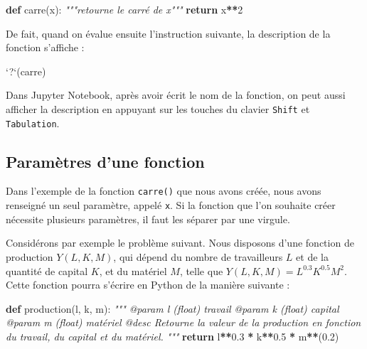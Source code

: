 \documentclass[12pt,]{book}
\newenvironment{Shaded}{\begin{snugshade}}{\end{snugshade}}
\newcommand{\KeywordTok}[1]{\textcolor[rgb]{0.13,0.29,0.53}{\textbf{#1}}}
\newcommand{\DataTypeTok}[1]{\textcolor[rgb]{0.13,0.29,0.53}{#1}}
\newcommand{\DecValTok}[1]{\textcolor[rgb]{0.00,0.00,0.81}{#1}}
\newcommand{\FloatTok}[1]{\textcolor[rgb]{0.00,0.00,0.81}{#1}}
\newcommand{\StringTok}[1]{\textcolor[rgb]{0.31,0.60,0.02}{#1}}
\newcommand{\CommentTok}[1]{\textcolor[rgb]{0.56,0.35,0.01}{\textit{#1}}}
\newcommand{\ControlFlowTok}[1]{\textcolor[rgb]{0.13,0.29,0.53}{\textbf{#1}}}
\newcommand{\OperatorTok}[1]{\textcolor[rgb]{0.81,0.36,0.00}{\textbf{#1}}}
\newcommand{\NormalTok}[1]{#1}
\numberwithin{equation}{section}
\numberwithin{countremarque}{section}
\begin{document}
\begin{Shaded}
\begin{Highlighting}[]
\KeywordTok{def}\NormalTok{ carre(x):}
  \CommentTok{"""retourne le carré de x"""}
  \ControlFlowTok{return}\NormalTok{ x}\OperatorTok{**}\DecValTok{2}
\end{Highlighting}
\end{Shaded}

De fait, quand on évalue ensuite l'instruction suivante, la description
de la fonction s'affiche :

\begin{Shaded}
\begin{Highlighting}[]
\StringTok{`}\DataTypeTok{?}\StringTok{`}\NormalTok{(carre)}
\end{Highlighting}
\end{Shaded}

Dans Jupyter Notebook, après avoir écrit le nom de la fonction, on peut
aussi afficher la description en appuyant sur les touches du clavier
\texttt{Shift} et \texttt{Tabulation}.

\subsection{Paramètres d'une fonction}\label{parametres-dune-fonction}

Dans l'exemple de la fonction \texttt{carre()} que nous avons créée,
nous avons renseigné un seul paramètre, appelé \texttt{x}. Si la
fonction que l'on souhaite créer nécessite plusieurs paramètres, il faut
les séparer par une virgule.

Considérons par exemple le problème suivant. Nous disposons d'une
fonction de production \(Y(L, K, M)\), qui dépend du nombre de
travailleurs \(L\) et de la quantité de capital \(K\), et du matériel
\(M\), telle que \(Y(L, K, M) = L^{0.3} K^{0.5}M^2\). Cette fonction
pourra s'écrire en Python de la manière suivante :

\begin{Shaded}
\begin{Highlighting}[]
\KeywordTok{def}\NormalTok{ production(l, k, m):}
  \CommentTok{"""}
\CommentTok{  @param l (float) travail}
\CommentTok{  @param k (float) capital}
\CommentTok{  @param m (float) matériel}
\CommentTok{  @desc Retourne la valeur de la production en fonction}
\CommentTok{    du travail, du capital et du matériel.}
\CommentTok{  """}
  \ControlFlowTok{return}\NormalTok{ l}\OperatorTok{**}\FloatTok{0.3} \OperatorTok{*}\NormalTok{ k}\OperatorTok{**}\FloatTok{0.5} \OperatorTok{*}\NormalTok{ m}\OperatorTok{**}\NormalTok{(}\FloatTok{0.2}\NormalTok{)}
\end{Highlighting}
\end{Shaded}
\end{document}
